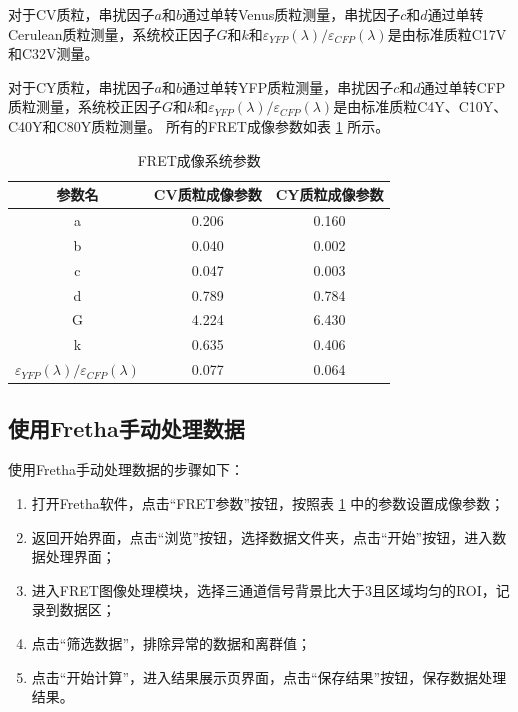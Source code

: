 对于CV质粒，串扰因子$a$和$b$通过单转Venus质粒测量，串扰因子$c$和$d$通过单转Cerulean质粒测量，系统校正因子$G$和$k$和$\varepsilon_{YFP}(\lambda)/\varepsilon_{CFP}(\lambda)$是由标准质粒C17V和C32V测量。

对于CY质粒，串扰因子$a$和$b$通过单转YFP质粒测量，串扰因子$c$和$d$通过单转CFP质粒测量，系统校正因子$G$和$k$和$\varepsilon_{YFP}(\lambda)/\varepsilon_{CFP}(\lambda)$是由标准质粒C4Y、C10Y、C40Y和C80Y质粒测量。
所有的FRET成像参数如表 \ref{tab:lurs_imaging_params} 所示。

\begin{table}[htbp]
    \centering
    \caption{FRET成像系统参数}
    \begin{tabular}{ccc}
        \toprule[1.5pt]
        参数名 & CV质粒成像参数 & CY质粒成像参数 \\
        \midrule
        a & 0.206 & 0.160\\
        b & 0.040 & 0.002\\
        c & 0.047 & 0.003\\
        d & 0.789 & 0.784\\
        G & 4.224 & 6.430\\
        k & 0.635 & 0.406\\
        $\varepsilon_{YFP}(\lambda)/\varepsilon_{CFP}(\lambda)$ & 0.077 & 0.064\\
        \bottomrule[1.5pt]
    \end{tabular}
    \label{tab:lurs_imaging_params}
\end{table}
\fi

\subsection{使用Fretha手动处理数据}
\label{sec:Fretha手动处理数据}
使用Fretha手动处理数据的步骤如下：
\begin{enumerate}
  \item 打开Fretha软件，点击“FRET参数”按钮，按照表 \ref{tab:lurs_imaging_params} 中的参数设置成像参数；
  \item 返回开始界面，点击“浏览”按钮，选择数据文件夹，点击“开始”按钮，进入数据处理界面；
  \item 进入FRET图像处理模块，选择三通道信号背景比大于3且区域均匀的ROI，记录到数据区；
  \item 点击“筛选数据”，排除异常的数据和离群值；
  \item 点击“开始计算”，进入结果展示页界面，点击“保存结果”按钮，保存数据处理结果。
\end{enumerate}

